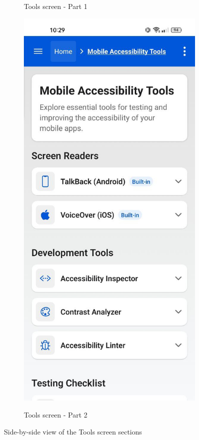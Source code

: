\begin{figure}[ht]
\begin{subfigure}[b]{0.48\textwidth}
        \caption{Tools screen - Part 1}
        \label{fig:tools-left}
    \end{subfigure}
    \hfill
    \begin{subfigure}[b]{0.48\textwidth}
        \centering
        \includegraphics[width=\linewidth, alt={Second part of the Tools screen}]{img/tools2.jpg}
        \caption{Tools screen - Part 2}
        \label{fig:tools-right}
    \end{subfigure}
    \caption{Side-by-side view of the Tools screen sections}
    \label{fig:tools_screens_sidebyside}
\end{figure}

